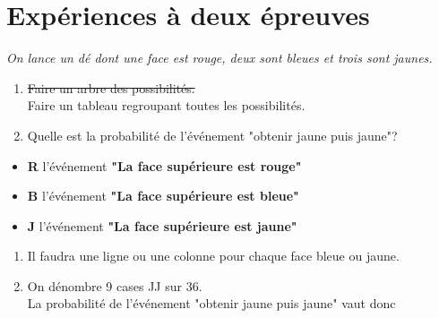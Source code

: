 \section{Expériences à deux épreuves}
\begin{exemple}[0.6]
    
    \textit{On lance un dé dont une face est rouge, deux sont bleues et trois sont jaunes.}
    \begin{enumerate}
        \item \sout{Faire un arbre des possibilités.}\\ Faire un tableau regroupant toutes les possibilités.
        \item Quelle est la probabilité de l'événement "obtenir jaune puis jaune"?
    \end{enumerate}
    \begin{itemize}
        \item \textbf{R} l’événement \textbf{"La face supérieure est rouge"}
        \item \textbf{B} l’événement \textbf{"La face supérieure est bleue"}
        \item \textbf{J} l’événement \textbf{"La face supérieure est jaune"}
    \end{itemize}    
    \correction 
    \begin{enumerate}
        \item Il faudra une ligne ou une colonne pour chaque face bleue ou jaune.
        
        \smallskip
        \smallskip
        \item On dénombre 9 cases JJ sur 36.\\\smallskip        
        La probabilité de l'événement "obtenir jaune puis jaune" vaut donc 
    \end{enumerate}
\end{exemple}

